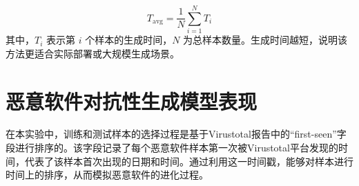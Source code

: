 \begin{enumerate}[label=\arabic*)]
	\begin{equation}
		T_{\text{avg}} = \frac{1}{N} \sum_{i=1}^{N} T_i
		\tag{5.8}
	\end{equation}
	其中，$T_i$ 表示第 $i$ 个样本的生成时间，$N$ 为总样本数量。生成时间越短，说明该方法更适合实际部署或大规模生成场景。

\end{enumerate}

\section{恶意软件对抗性生成模型表现}

在本实验中，训练和测试样本的选择过程是基于Virustotal报告中的“first-seen”字段进行排序的。该字段记录了每个恶意软件样本第一次被Virustotal平台发现的时间，代表了该样本首次出现的日期和时间。通过利用这一时间戳，能够对样本进行时间上的排序，从而模拟恶意软件的进化过程。




